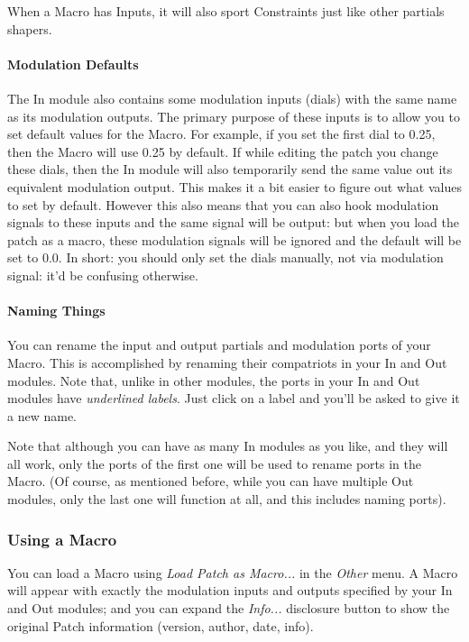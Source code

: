 \documentclass{article}
\begin{document}
When a Macro has Inputs, it will also sport Constraints just like other partials shapers.

\paragraph{Modulation Defaults}

The In module also contains some modulation inputs (dials) with the same name as its modulation outputs.  The primary purpose of these inputs is to allow you to set default values for the Macro.   For example, if you set the first dial to 0.25, then the Macro will use 0.25 by default.  If while editing the patch you change these dials, then the In module will also temporarily send the same value out its equivalent modulation output.  This makes it a bit easier to figure out what values to set by default.  However this also means that you can also hook modulation signals to these inputs and the same signal will be output: but when you load the patch as a macro, these modulation signals will be ignored and the default will be set to 0.0.  In short: you should only set the dials manually, not via modulation signal: it'd be confusing otherwise.

\paragraph{Naming Things}

You can rename the input and output partials and modulation ports of your Macro.  This is accomplished by renaming their compatriots in your In and Out modules.  Note that, unlike in other modules, the ports in your In and Out modules have {\it underlined labels}.  Just click on a label and you'll be asked to give it a new name.

Note that although you can have as many In modules as you like, and they will all work, only the ports of the first one will be used to rename ports in the Macro.  (Of course, as mentioned before, while you can have multiple Out modules, only the last one will function at all, and this includes naming ports).

\subsubsection{Using a Macro}

You can load a Macro using {\it Load Patch as Macro...} in the {\it Other} menu.  A Macro will appear with exactly the modulation inputs and outputs specified by your In and Out modules; and you can expand the {\it Info...} disclosure button to show the original Patch information (version, author, date, info).
\end{document}

